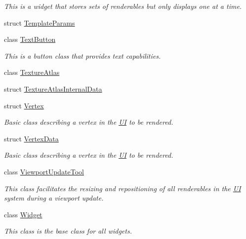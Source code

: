 \begin{DoxyCompactItemize}
\begin{DoxyCompactList}\small\item\em This is a widget that stores sets of renderables but only displays one at a time. \item\end{DoxyCompactList}\item 
struct \hyperlink{structMezzanine_1_1UI_1_1TemplateParams}{TemplateParams}
\item 
class \hyperlink{classMezzanine_1_1UI_1_1TextButton}{TextButton}
\begin{DoxyCompactList}\small\item\em This is a button class that provides text capabilities. \item\end{DoxyCompactList}\item 
class \hyperlink{classMezzanine_1_1UI_1_1TextureAtlas}{TextureAtlas}
\item 
struct \hyperlink{structMezzanine_1_1UI_1_1TextureAtlasInternalData}{TextureAtlasInternalData}
\item 
struct \hyperlink{structMezzanine_1_1UI_1_1Vertex}{Vertex}
\begin{DoxyCompactList}\small\item\em Basic class describing a vertex in the \hyperlink{namespaceMezzanine_1_1UI}{UI} to be rendered. \item\end{DoxyCompactList}\item 
struct \hyperlink{structMezzanine_1_1UI_1_1VertexData}{VertexData}
\begin{DoxyCompactList}\small\item\em Basic class describing a vertex in the \hyperlink{namespaceMezzanine_1_1UI}{UI} to be rendered. \item\end{DoxyCompactList}\item 
class \hyperlink{classMezzanine_1_1UI_1_1ViewportUpdateTool}{ViewportUpdateTool}
\begin{DoxyCompactList}\small\item\em This class facilitates the resizing and repositioning of all renderables in the \hyperlink{namespaceMezzanine_1_1UI}{UI} system during a viewport update. \item\end{DoxyCompactList}\item 
class \hyperlink{classMezzanine_1_1UI_1_1Widget}{Widget}
\begin{DoxyCompactList}\small\item\em This class is the base class for all widgets. \item\end{DoxyCompactList}\item 

\end{DoxyCompactItemize}
